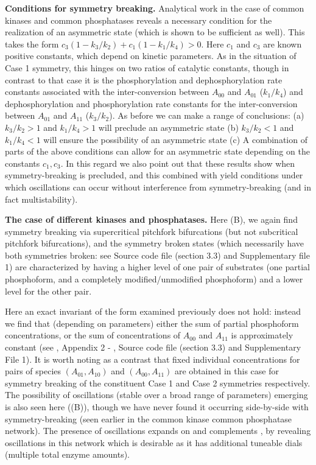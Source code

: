 \documentclass[9pt,lineno]{elife}
\begin{document}
{\bf Conditions for symmetry breaking.}   Analytical work in the case of common kinases and common phosphatases reveals a necessary condition for the realization of an asymmetric state (which is shown to be sufficient as well).
This takes the form $c_3(1-k_3/k_2)+c_1 (1-k_1/k_4)>0$.
Here $c_1$ and $c_3$ are known positive constants, which depend on kinetic parameters. As in the situation of Case 1 symmetry, this hinges on two ratios of catalytic constants, though in contrast to that case it is the phosphorylation and dephosphorylation rate constants associated with the inter-conversion between $A_{00}$ and $A_{01}$  ($k_1/k_4$) and dephosphorylation and phosphorylation rate constants for the inter-conversion between $A_{01}$ and $A_{11}$ ($k_3/k_2$). As before we can make a range of conclusions: (a) $k_3/k_2>1$ and $k_1/k_4>1$ will preclude an asymmetric state (b) $k_3/k_2<1$ and $k_1/k_4 <1$ will ensure the possibility of an asymmetric state (c) A combination of parts of the above conditions can allow for an asymmetric state depending on the constants $c_1,c_3$. In this regard we also point out that these results show when symmetry-breaking is precluded, and this combined with \cite{Jolley2012} yield conditions under which oscillations can occur without interference from symmetry-breaking (and in fact multistability).

{\bf The case of different kinases and phosphatases.} Here (B), we again find symmetry breaking via supercritical pitchfork bifurcations (but not subcritical pitchfork bifurcations), and the symmetry broken states (which necessarily have both symmetries broken: see Source code file (section 3.3) and Supplementary file 1) are characterized by having a higher level of one pair of substrates (one partial phosphoform, and a completely modified/unmodified phosphoform) and a lower level for the other pair.

Here an exact invariant of the form examined previously does not hold: instead we find that (depending on parameters) either the sum of partial phosphoform concentrations, or the sum of concentrations of $A_{00}$ and $A_{11}$ is approximately constant (see , Appendix 2 - , Source code file (section 3.3) and Supplementary File 1). It is worth noting as a contrast that fixed individual concentrations for pairs of species $(A_{01},A_{10})$ and $(A_{00},A_{11})$ are obtained in this case for symmetry breaking of the constituent Case 1 and Case 2 symmetries respectively.
The possibility of oscillations (stable over a broad range of parameters) emerging is also seen here ((B)), though we have never found it occurring side-by-side with symmetry-breaking (seen earlier in the common kinase common phosphatase network). The presence of oscillations expands on and complements \cite{Jolley2012}, by revealing oscillations in this network which is desirable as it has additional tuneable dials (multiple total enzyme amounts).
\end{document}
